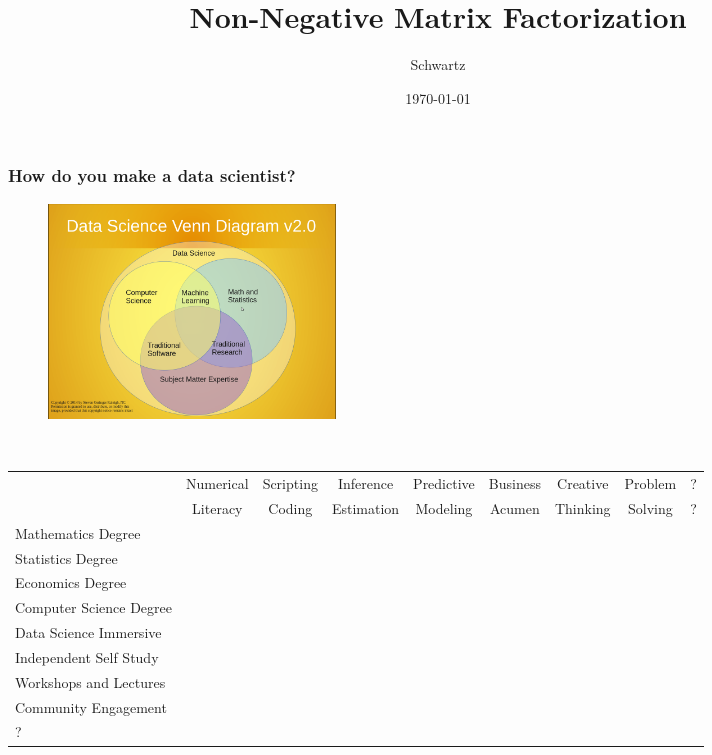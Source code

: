 \documentclass[xcolor={dvipsnames}]{beamer}
\title{Non-Negative Matrix Factorization}
\author{Schwartz}
\date{\today}
\begin{document}
\frame{\titlepage}


\frame
{
\frametitle{How do you make a data scientist?}

\begin{figure}
\hspace*{.3in}\includegraphics[width=3in]{stuff/ds_venn.png} \\${}$\\
\end{figure}
\vspace{-4em}

\tiny
\noindent \begin{columns}
\hspace*{-.7in}
\begin{column}{1\textwidth}
\begin{table}
\begin{tabular}{l|cccccccc}
& Numerical &  Scripting & Inference & Predictive  &  Business & Creative & Problem& ? \\
 &Literacy &   Coding & Estimation &  Modeling &  Acumen &  Thinking & Solving& ? \\\hline
Mathematics Degree & \\ 
Statistics Degree & \\
Economics Degree & \\
Computer Science Degree & \\
Data Science Immersive & \\
Independent Self Study &  \\
Workshops and Lectures &  \\
Community Engagement & \\
? \\
\end{tabular}
\end{table}
\end{column}
\end{columns}

}
\end{document}
